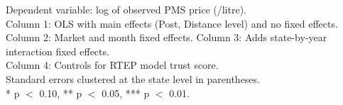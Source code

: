 \begin{table}[htbp]
   \par \raggedright 
   Dependent variable: log of observed PMS price (\naira/litre).\\
   Column 1: OLS with main effects (Post, Distance level) and no fixed effects.\\
   Column 2: Market and month fixed effects. Column 3: Adds state-by-year interaction fixed effects.\\
   Column 4: Controls for RTEP model trust score.\\
   Standard errors clustered at the state level in parentheses.\\
   * p $<$ 0.10, ** p $<$ 0.05, *** p $<$ 0.01.
\end{table}


